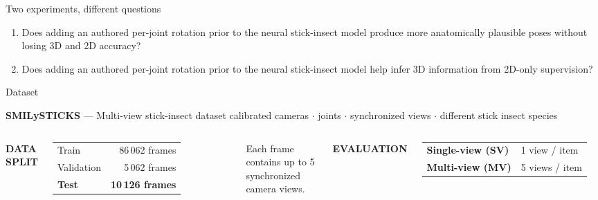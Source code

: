 \documentclass[aspectratio=169,11pt]{beamer}
\begin{document}
\begin{frame}{Two experiments, different questions}
\begin{enumerate}

    \item Does adding an authored per-joint rotation prior to the neural stick-insect model produce more anatomically plausible poses without losing 3D and 2D accuracy?
    \item Does adding an authored per-joint rotation prior to the neural stick-insect model help infer 3D information from 2D-only supervision?
\end{enumerate}    
\end{frame}
\begin{frame}{Dataset}
  \vspace{0.2em}

  \begin{block}{\centering \textbf{SMILySTICKS} — Multi-view stick-insect dataset}
     calibrated cameras \quad $\cdot$  joints \quad $\cdot$  synchronized views \quad $\cdot$  different stick insect species 
  \end{block}

  \vspace{0.7em}

  \begin{columns}[T,onlytextwidth]

    {\color{teal}\footnotesize\bfseries DATA SPLIT}

    \vspace{0.35em}

    \begin{tabular}{@{}lr@{}}
      Train & 86\,062 frames \\
      Validation & 5\,062 frames \\
      \textbf{Test} & \textbf{10\,126 frames}
    \end{tabular}

    \vspace{0.3em}

    {\footnotesize\color{inkSoft}
    Each frame contains up to 5 synchronized camera views.}

    {\color{teal}\footnotesize\bfseries EVALUATION}

    \vspace{0.35em}

    \begin{tabular}{@{}ll@{}}
      \textbf{Single-view (SV)} & 1 view / item \\
      \textbf{Multi-view (MV)} & 5 views / item
    \end{tabular}


\end{columns}
\end{frame}
\end{document}
